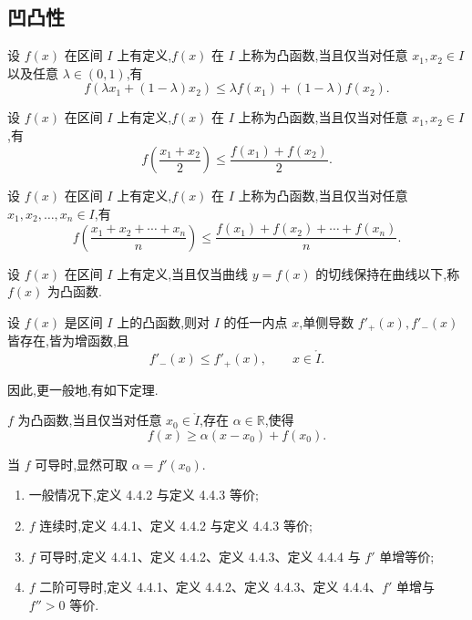 \documentclass[../../数学分析培优讲义.tex]{subfiles}
\begin{document}
\subsection{凹凸性}

\begin{definition}
设 $f(x)$ 在区间 $I$ 上有定义,$f(x)$ 在 $I$ 上称为凸函数,当且仅当对任意 $x_1,x_2\in I$ 以及任意 $\lambda\in(0,1)$,有
\[
    f(\lambda x_1+(1-\lambda)x_2)
    \leq\lambda f(x_1)+(1-\lambda)f(x_2).
\]
\end{definition}

\begin{definition}
设 $f(x)$ 在区间 $I$ 上有定义,$f(x)$ 在 $I$ 上称为凸函数,当且仅当对任意 $x_1,x_2\in I$,有
\[
    f\left(\dfrac{x_1+x_2}{2}\right)
    \leq\dfrac{f(x_1)+f(x_2)}{2}.
\]
\end{definition}

\begin{definition}
设 $f(x)$ 在区间 $I$ 上有定义,$f(x)$ 在 $I$ 上称为凸函数,当且仅当对任意 $x_1,x_2,\ldots,x_n\in I$,有
\[
    f\left(\dfrac{x_1+x_2+\cdots+x_n}{n}\right)
    \leq\dfrac{f(x_1)+f(x_2)+\cdots+f(x_n)}{n}.
\]
\end{definition}

\begin{definition}
设 $f(x)$ 在区间 $I$ 上有定义,当且仅当曲线 $y=f(x)$ 的切线保持在曲线以下,称 $f(x)$ 为凸函数.
\end{definition}

\begin{lemma}[\markstar]
设 $f(x)$ 是区间 $I$ 上的凸函数,则对 $I$ 的任一内点 $x$,单侧导数 $f'_+(x),f'_-(x)$ 皆存在,皆为增函数,且
\[
    f'_-(x)\leq f'_+(x),
    \qquad x\in\mathring I.
\]
\end{lemma}

因此,更一般地,有如下定理.

\begin{theorem}[\markstar]
$f$ 为凸函数,当且仅当对任意 $x_0\in\mathring I$,存在 $\alpha\in\mathbb{R}$,使得
\[
    f(x)\geq\alpha(x-x_0)+f(x_0).
\]
\end{theorem}

\begin{remark}
当 $f$ 可导时,显然可取 $\alpha=f'(x_0)$.
\end{remark}

\begin{theorem}[\markstar]
\begin{enumerate}[label=(\arabic*)]
    \item 一般情况下,定义 4.4.2 与定义 4.4.3 等价;
    \item $f$ 连续时,定义 4.4.1、定义 4.4.2 与定义 4.4.3 等价;
    \item $f$ 可导时,定义 4.4.1、定义 4.4.2、定义 4.4.3、定义 4.4.4 与 $f'$ 单增等价;
    \item $f$ 二阶可导时,定义 4.4.1、定义 4.4.2、定义 4.4.3、定义 4.4.4、$f'$ 单增与 $f''>0$ 等价.
\end{enumerate}
\end{theorem}
\end{document}

